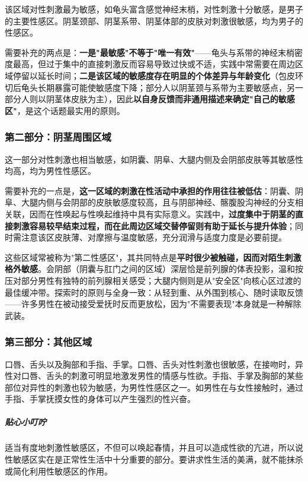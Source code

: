 该区域对性刺激最为敏感，如龟头富含感觉神经末梢，对性刺激十分敏感，是男子的主要性感区。阴茎颈部、阴茎系带、阴茎体部的皮肤对刺激很敏感，均为男子的性感区。


需要补充的两点是：\textbf{一是"最敏感"不等于"唯一有效"}——龟头与系带的神经末梢密度最高，但过于集中的直接刺激反而容易导致过快或不适，实践中常需要在周边区域停留以延长时间；\textbf{二是该区域的敏感度存在明显的个体差异与年龄变化}（包皮环切后龟头长期暴露可能使敏感度下降；部分人以阴茎颈与系带为主要敏感点，另一部分人则以阴茎体皮肤为主），因此\textbf{以自身反馈而非通用描述来确定"自己的敏感区"}，是这个话题最实用的原则。

\subsubsection{第二部分：阴茎周围区域}

这一部分对性刺激也相当敏感，如阴囊、阴阜、大腿内侧及会阴部皮肤等其敏感性均高，均为男性性感区。


需要补充的一点是，\textbf{这一区域的刺激在性活动中承担的作用往往被低估}：阴囊、阴阜、大腿内侧与会阴部的皮肤敏感度较高，且与阴部神经、髂腹股沟神经的分支相关联，因而在性唤起与性唤起维持中具有实际意义。实践中，\textbf{过度集中于阴茎的直接刺激容易较早结束过程，而在此周边区域交替停留则有助于延长与提升体验}；同时需注意该区皮肤薄、对摩擦与温度敏感，充分润滑与适度力度是必要前提。

这些区域常被称为"第二性感区"，其共同特点是\textbf{平时很少被触碰，因而对陌生刺激格外敏感}。会阴部（阴囊与肛门之间的区域）深层恰是前列腺的体表投影，温和按压对部分男性有独特的前列腺相关感受；大腿内侧则是从"安全区"向核心区过渡的最佳缓冲带。探索时的原则与全身一致：从轻到重、从外围到核心、随时读取反馈——许多男性在被动接受爱抚时反而更放松，因为"不需要表现"本身就是一种解除武装。


\subsubsection{第三部分：其他区域}

口唇、舌头以及胸部和手指、手掌。口唇、舌头对性刺激也很敏感，在接吻时，异性对口唇、舌头的刺激可明显地激发男性的情感与性欲。手指、手掌及胸部的某些部位对异性的刺激也较为敏感，为男性性感区之一。如男性在与女性接触时，通过手指、手掌抚摸女性的身体可以产生强烈的性兴奋。

\subparagraph{贴心小叮咛}

适当有度地刺激性敏感区，不但可以唤起春情，并且可以造成性欲的亢进，所以说性敏感区实在是正常性生活中十分重要的部分。要讲求性生活的美满，就不能抹杀或简化利用性敏感区的作用。

